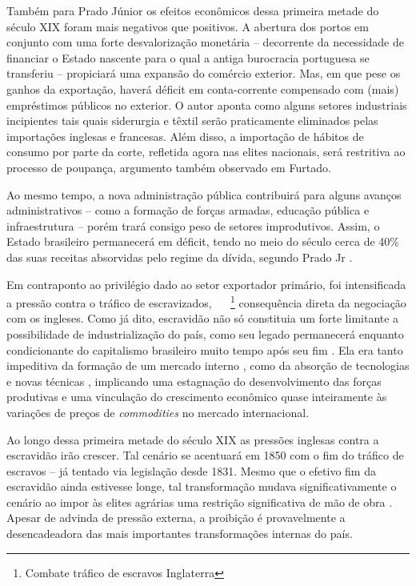 Também para Prado Júnior
\citeyearpar{pradojunior2012} os efeitos
econômicos dessa primeira metade do século XIX foram mais negativos que
positivos. A abertura dos portos em conjunto com uma forte
desvalorização monetária -- decorrente da necessidade de financiar o
Estado nascente para o qual a antiga burocracia portuguesa se transferiu
-- propiciará uma expansão do comércio exterior. Mas, em que pese os
ganhos da exportação, haverá déficit em conta-corrente compensado com
(mais) empréstimos públicos no exterior. O autor aponta como alguns
setores industriais incipientes tais quais siderurgia e têxtil serão
praticamente eliminados pelas importações inglesas e francesas. Além
disso, a importação de hábitos de consumo por parte da corte, refletida
agora nas elites nacionais, será restritiva ao processo de poupança,
argumento também observado em
Furtado\citeyearpar{furtado2005}.

Ao mesmo tempo, a nova administração pública contribuirá para alguns
avanços administrativos -- como a formação de forças armadas, educação
pública e infraestrutura -- porém trará consigo peso de setores
improdutivos. Assim, o Estado brasileiro permanecerá em déficit, tendo
no meio do século cerca de 40\% das suas receitas absorvidas pelo regime
da dívida, segundo Prado Jr
\citeyearpar{pradojunior2012}.


Em contraponto ao privilégio dado ao setor exportador primário, foi
intensificada a pressão contra o tráfico de escravizados,
~
~\footnote {Combate tráfico de escravos Inglaterra}
consequência direta da negociação com
os ingleses. Como já dito, escravidão não só constituia um forte
limitante a possibilidade de industrialização do país, como seu legado
permanecerá enquanto condicionante do capitalismo brasileiro muito tempo
após seu fim \citep{mello1982}. Ela era tanto impeditiva da formação de um mercado interno
\citep{furtado2005}, como
da absorção de tecnologias e novas técnicas
\citep{pradojunior2012},
implicando uma estagnação do desenvolvimento das forças produtivas e uma
vinculação do crescimento econômico quase inteiramente às variações de
preços de \emph{commodities} no mercado internacional.

Ao longo dessa primeira metade do século XIX as pressões inglesas contra
a escravidão irão crescer. Tal cenário se acentuará em 1850 com o fim do
tráfico de escravos -- já tentado via legislação desde 1831. Mesmo que o
efetivo fim da escravidão ainda estivesse longe, tal transformação
mudava significativamente o cenário ao impor às elites agrárias uma
restrição significativa de mão de obra
\citep{furtado2005,mello1982,pradojunior2012}. Apesar de advinda de pressão externa,
a proibição é provavelmente a desencadeadora das mais importantes transformações
internas do país.

